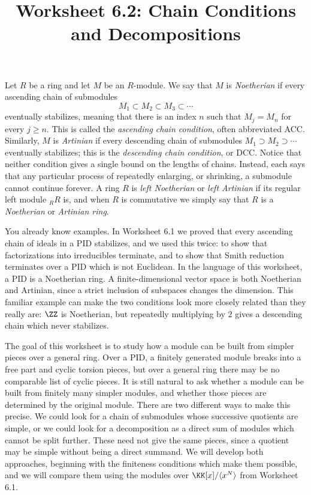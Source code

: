 \documentclass[12pt,reqno]{amsart}
\title{Worksheet 6.2: Chain Conditions and Decompositions}
\begin{document}
\maketitle
\thispagestyle{firstpage}

Let $R$ be a ring and let $M$ be an $R$-module. We say that $M$ is \emph{Noetherian} if every ascending chain of submodules
\[
M_1\subset M_2\subset M_3\subset\cdots
\]
eventually stabilizes, meaning that there is an index $n$ such that $M_j=M_n$ for every $j\geq n$. This is called the \emph{ascending chain condition}, often abbreviated ACC. Similarly, $M$ is \emph{Artinian} if every descending chain of submodules $M_1\supset M_2\supset\cdots$ eventually stabilizes; this is the \emph{descending chain condition}, or DCC. Notice that neither condition gives a single bound on the lengths of chains. Instead, each says that any particular process of repeatedly enlarging, or shrinking, a submodule cannot continue forever. A ring $R$ is \emph{left Noetherian} or \emph{left Artinian} if its regular left module ${}_RR$ is, and when $R$ is commutative we simply say that $R$ is a \emph{Noetherian} or \emph{Artinian ring}.

You already know examples. In Worksheet 6.1 we proved that every ascending chain of ideals in a PID stabilizes, and we used this twice: to show that factorizations into irreducibles terminate, and to show that Smith reduction terminates over a PID which is not Euclidean. In the language of this worksheet, a PID is a Noetherian ring. A finite-dimensional vector space is both Noetherian and Artinian, since a strict inclusion of subspaces changes the dimension. This familiar example can make the two conditions look more closely related than they really are: $\ZZ$ is Noetherian, but repeatedly multiplying by $2$ gives a descending chain which never stabilizes.

The goal of this worksheet is to study how a module can be built from simpler pieces over a general ring. Over a PID, a finitely generated module breaks into a free part and cyclic torsion pieces, but over a general ring there may be no comparable list of cyclic pieces. It is still natural to ask whether a module can be built from finitely many simpler modules, and whether those pieces are determined by the original module. There are two different ways to make this precise. We could look for a chain of submodules whose successive quotients are simple, or we could look for a decomposition as a direct sum of modules which cannot be split further. These need not give the same pieces, since a quotient may be simple without being a direct summand. We will develop both approaches, beginning with the finiteness conditions which make them possible, and we will compare them using the modules over $\KK[x]/\langle x^N\rangle$ from Worksheet 6.1.
\end{document}
